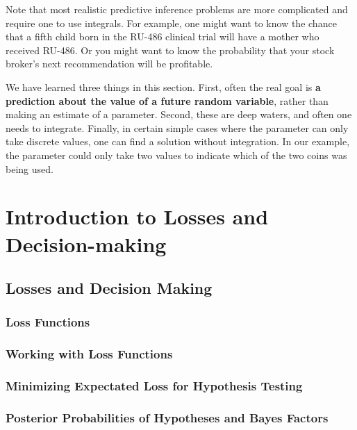 \documentclass[]{book}
\theoremstyle{definition}
\theoremstyle{definition}
\theoremstyle{remark}
\begin{document}
Note that most realistic predictive inference problems are more
complicated and require one to use integrals. For example, one might
want to know the chance that a fifth child born in the RU-486 clinical
trial will have a mother who received RU-486. Or you might want to know
the probability that your stock broker's next recommendation will be
profitable.

We have learned three things in this section. First, often the real goal
is \textbf{a prediction about the value of a future random variable},
rather than making an estimate of a parameter. Second, these are deep
waters, and often one needs to integrate. Finally, in certain simple
cases where the parameter can only take discrete values, one can find a
solution without integration. In our example, the parameter could only
take two values to indicate which of the two coins was being used.

\chapter{Introduction to Losses and
Decision-making}\label{introduction-to-losses-and-decision-making}

\section{Losses and Decision Making}\label{losses-and-decision-making}

\subsection{Loss Functions}\label{loss-functions}

\subsection{Working with Loss
Functions}\label{working-with-loss-functions}

\subsection{Minimizing Expectated Loss for Hypothesis
Testing}\label{minimizing-expectated-loss-for-hypothesis-testing}

\subsection{Posterior Probabilities of Hypotheses and Bayes
Factors}\label{posterior-probabilities-of-hypotheses-and-bayes-factors}
\end{document}
